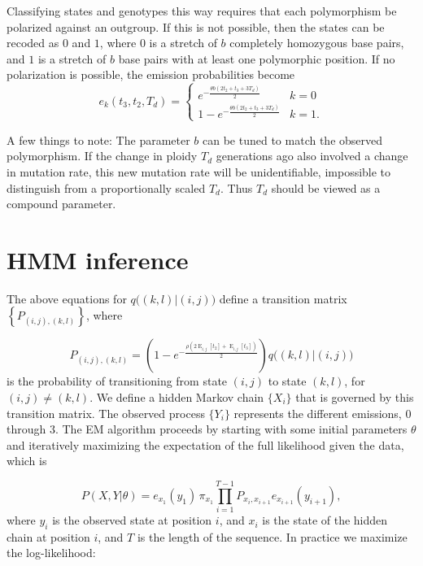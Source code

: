 \documentclass{article}
\DeclareMathOperator{\E}{E}
\begin{document}
Classifying states and genotypes this way requires that each polymorphism be
polarized against an outgroup. If this is not possible, then the states can be
recoded as $0$ and $1$, where $0$ is a stretch of $b$ completely homozygous
base pairs, and $1$ is a stretch of $b$ base pairs with at least one
polymorphic position. If no polarization is possible, the emission
probabilities become
\begin{equation}
    e_k(t_3,t_2, T_d) =
    \begin{cases}
        e^{-\frac{\theta b \left(2t_2+t_3+3T_d\right)}{2}}&k=0\\
        1-e^{-\frac{\theta b \left(2t_2+t_3+3T_d\right)}{2}}&k=1.
    \end{cases}
    \label{eq:emissionprobsnopolar}
\end{equation}

A few things to note: The parameter $b$ can be tuned to match the observed
polymorphism. If the change in ploidy $T_d$ generations ago also involved a
change in mutation rate, this new mutation rate will be unidentifiable,
impossible to distinguish from a proportionally scaled $T_d$. Thus $T_d$ should
be viewed as a compound parameter.

\section{HMM inference}

The above equations for $q\big((k,l)|(i,j)\big)$ define a transition matrix
$\left\{P_{(i,j), (k,l)}\right\}$, where

\begin{equation}
    P_{(i,j), (k,l)} =
    \left(1-e^{-\frac{\rho(2\E_{i,j}[t_2]+\E_{i,j}[t_3])}{2}}\right)
        q\big((k,l)|(i,j)\big)
\end{equation}
is the probability of transitioning from state $(i,j)$ to state $(k,l)$, for
$(i,j) \neq (k,l)$. We define a hidden Markov chain $\{X_i\}$ that is governed
by this transition matrix.  The observed process $\{Y_i\}$ represents the
different emissions, $0$ through $3$. The EM algorithm proceeds by starting
with some initial parameters $\theta$ and iteratively maximizing the
expectation of the full likelihood given the data, which is

\begin{equation}
    P(X,Y | \theta) =
        e_{x_1}(y_1)\,\pi_{x_1}\prod_{i=1}^{T-1}P_{x_i,x_{i+1}}e_{x_{i+1}}(y_{i+1}),
\end{equation}
where $y_i$ is the observed state at position $i$, and $x_i$ is the state of
the hidden chain at position $i$, and $T$ is the length of the sequence. In
practice we maximize the log-likelihood:
\end{document}

